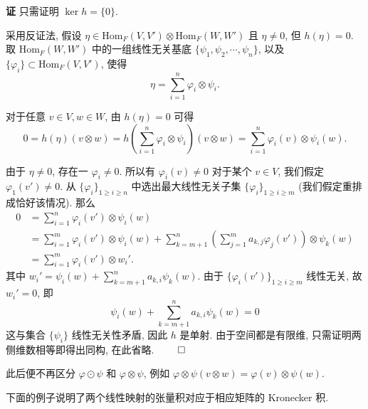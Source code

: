 \hspace{-2em}\textbf{证} \hspace{0.5em} 只需证明 $\ker{h} = \{0\}$. 

采用反证法, 假设 $\eta \in \text{Hom}_F(V,V') \otimes \text{Hom}_F(W,W')$ 且 $\eta \neq 0$, 但 $h(\eta) = 0$. 取 $\text{Hom}_F(W,W')$ 中的一组线性无关基底 $\{\psi_1, \psi_2, \cdots, \psi_n\}$, 以及 $\{\varphi_i\} \subset \text{Hom}_F(V,V')$, 使得
\begin{equation*}
    \eta = \sum_{i=1}^n \varphi_i \otimes \psi_i.
\end{equation*}

对于任意 $v \in V, w \in W$, 由 $h(\eta) = 0$ 可得
\begin{equation*}
    0 = h(\eta)(v \otimes w) =h \left( \sum_{i=1}^n \varphi_i \otimes \psi_i \right)(v \otimes w)= \sum_{i=1}^n \varphi_i(v) \otimes \psi_i(w).
\end{equation*}

由于 $\eta \ne 0$, 存在一 $\varphi_i \ne 0$. 所以有 $\varphi_i(v) \ne 0$ 对于某个 $v \in V$, 我们假定 $\varphi_1(v')\ne 0$. 从 $\{\varphi_i\}_{1 \ge i \ge n}$ 中选出最大线性无关子集 $\{\varphi_i\}_{1 \ge i \ge m}$ (我们假定重排成恰好该情况). 那么
\begin{align*}
    0 &= \sum_{i=1}^n \varphi_i(v') \otimes \psi_i(w) \\
    &= \sum_{i=1}^m \varphi_i(v') \otimes \psi_i(w) + \sum_{k=m+1}^n \left (\sum_{j=1}^m a_{k,j}\varphi_j(v') \right) \otimes \psi_k(w) \\
    &= \sum_{i=1}^m \varphi_i(v') \otimes w_i'.
\end{align*}
其中 $w_i' = \psi_i(w) + \sum_{k=m+1}^n a_{k,i}\psi_k(w)$. 由于 $\{\varphi_i(v')\}_{1 \ge i \ge m}$ 线性无关, 故 $w_i' = 0$, 即
\begin{equation*}
    \psi_i(w) + \sum_{k=m+1}^n a_{k,i}\psi_k(w) = 0
\end{equation*}
这与集合 $\{\psi_i\}$ 线性无关性矛盾, 因此 $h$ 是单射. 由于空间都是有限维, 只需证明两侧维数相等即得出同构, 在此省略. \hfill\(\qed\)

此后便不再区分 $\varphi \odot \psi$ 和 $\varphi \otimes \psi$, 例如 $\varphi \otimes \psi(v \otimes w) = \varphi(v) \otimes \psi(w)$.

下面的例子说明了两个线性映射的张量积对应于相应矩阵的 Kronecker 积.

\vspace{0.6em}

